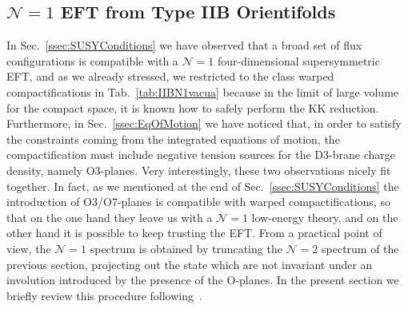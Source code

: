 \documentclass[12pt,a4paper]{book}
\begin{document}
\subsection{$\mathcal{N} = 1$ EFT from Type IIB Orientifolds}
\label{ssec:EFTfromIIB}

In Sec.~\ref{ssec:SUSYConditions} we have observed that a broad set of flux configurations is compatible with a $\mathcal{N} = 1$ four-dimensional supersymmetric EFT, and as we already stressed, we restricted to the class warped compactifications in Tab.~\ref{tab:IIBN1vacua} because in the limit of large volume for the compact space, it is known how to safely perform the KK reduction. Furthermore, in Sec.~\ref{ssec:EqOfMotion} we have noticed that, in order to satisfy the constraints coming from the integrated equations of motion, the compactification must include negative tension sources for the D3-brane charge density, namely O3-planes. Very interestingly, these two observations nicely fit together. In fact, as we mentioned at the end of Sec.~\ref{ssec:SUSYConditions} the introduction of O3/O7-planes is compatible with warped compactifications, so that on the one hand they leave us with a $\mathcal{N} = 1$ low-energy theory, and on the other hand it is possible to keep trusting the EFT. From a practical point of view, the $\mathcal{N} = 1$ spectrum is obtained by truncating the $\mathcal{N} = 2$ spectrum of the previous section, projecting out the state which are not invariant under an involution introduced by the presence of the O-planes. In the present section we briefly review this procedure following~\cite{Grana:2003ek}.\\
\end{document}
